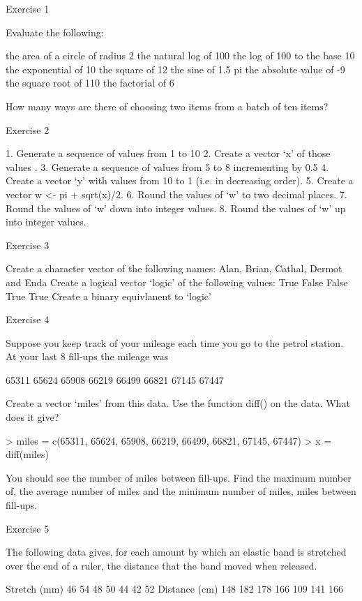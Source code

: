  
Exercise 1
 
Evaluate the following:
 


the area of a circle of radius 2             
the natural log of  100           	            
the log of 100 to the base 10   
the exponential of 10           	            
the square of 12           	          	            
the sine of 1.5 pi           	            
the absolute value of  -9             
the square root of 110             
the factorial of 6


How many ways are there of choosing two items from a batch of ten items?
 
Exercise 2
 
1.      Generate a sequence of values from 1 to 10
2.      Create a vector ‘x’ of those values .
3.      Generate a sequence of values from 5 to 8 incrementing by 0.5
4.      Create a vector ‘y’ with values from 10 to 1 (i.e. in decreasing order).
5.      Create a vector w <- pi + sqrt(x)/2.
6.      Round the values of ‘w’ to two decimal places.
7.      Round the values of ‘w’ down into integer values.
8.      Round the values of ‘w’ up into integer values.
 
Exercise 3
 
Create a character vector of the following names: Alan, Brian, Cathal, Dermot and Enda
Create a logical vector ‘logic’ of the following values: True False False True True
Create a binary equivlanent to ‘logic’
 
Exercise 4
 
Suppose you keep track of your mileage each time you go to the petrol station. At your last 8 fill-ups the mileage was
 
65311 65624 65908 66219 66499 66821 67145 67447
 
Create a vector ‘miles’ from this data. Use the function diff() on the data. What does it give?
 
> miles = c(65311, 65624, 65908, 66219, 66499, 66821, 67145, 67447)
> x = diff(miles)
 
You should see the number of miles between fill-ups.  Find the maximum number of, the average number of miles and the minimum number of miles, miles between fill-ups.
 
Exercise 5
 
The following data gives, for each amount by which an elastic band is stretched over
the end of a ruler, the distance that the band moved when released.
 
Stretch (mm)
46
54
48
50
44
42
52
Distance (cm)
148
182
178
166
109
141
166
 
